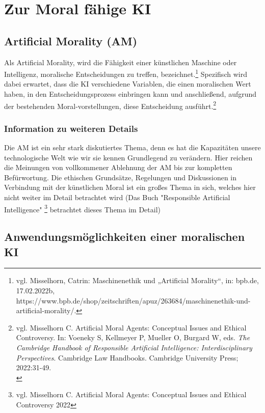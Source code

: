 \section{Zur Moral fähige KI}\label{sec::moralische KI}

\subsection{Artificial Morality (AM)}\label{subsec::artificial morality}

Als Artificial Morality, wird die Fähigkeit einer künstlichen Maschine oder Intelligenz, moralische Entscheidungen zu
treffen, bezeichnet.\footnote{vgl. Misselhorn, Catrin: Maschinenethik und „Artificial Morality“, in: bpb.de, 17.02.2022b, https://www.bpb.de/shop/zeitschriften/apuz/263684/maschinenethik-und-artificial-morality/.} Spezifisch
wird dabei erwartet, dass die KI verschiedene Variablen, die einen moralischen Wert haben, in den Entscheidungsprozess
einbringen kann und anschließend, aufgrund der bestehenden Moral-vorstellungen, diese Entscheidung ausführt.\footnote{vgl. Misselhorn C. Artificial Moral Agents:
Conceptual Issues and Ethical Controversy.
In: Voeneky S, Kellmeyer P, Mueller O, Burgard W, eds.
\textit{The Cambridge Handbook of Responsible Artificial Intelligence: Interdisciplinary Perspectives}.
Cambridge Law Handbooks.
Cambridge University Press; 2022:31-49. \\}

\subsubsection{Information zu weiteren Details}

Die AM ist ein sehr stark diskutiertes Thema, denn es hat die Kapazitäten unsere technologische Welt wie wir sie kennen
Grundlegend zu verändern.
Hier reichen die Meinungen von vollkommener Ablehnung der AM bis zur kompletten Befürwortung.
Die ethischen Grundsätze, Regelungen und Diskussionen in Verbindung mit der künstlichen Moral ist ein großes Thema
in sich, welches hier nicht weiter im Detail betrachtet wird (Das Buch "Responsible Artificial Intelligence"
\footnote{vgl. Misselhorn C. Artificial Moral Agents: Conceptual Issues and Ethical Controversy 2022} betrachtet dieses Thema im Detail)

\subsection{Anwendungsmöglichkeiten einer moralischen KI}\label{subsec::anwendungen}

